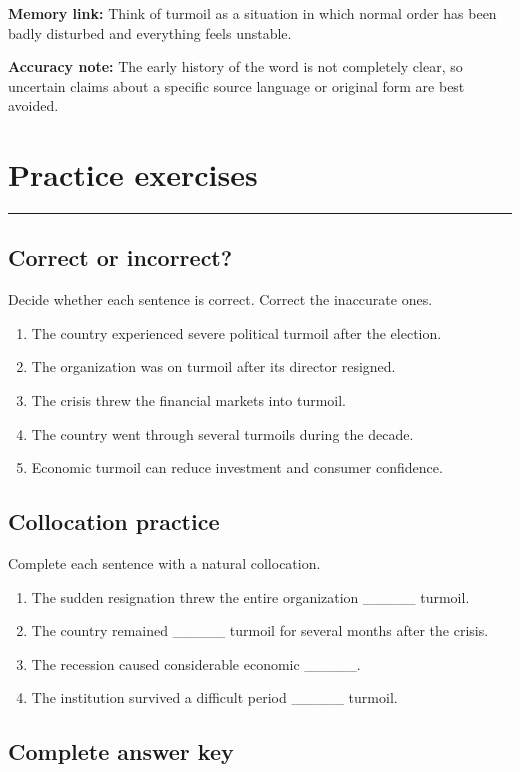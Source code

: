 \documentclass[11pt]{article}
\newcommand{\sectionrule}{\par\vspace{-0.5em}\noindent\textcolor{Accent}{\rule{\linewidth}{0.6pt}}\par}
\begin{document}
\textbf{Memory link:} Think of turmoil as a situation in which normal order has been badly disturbed and everything feels unstable.

\textbf{Accuracy note:} The early history of the word is not completely clear, so uncertain claims about a specific source language or original form are best avoided.

\section{Practice exercises}
\sectionrule
\subsection{Correct or incorrect?}
Decide whether each sentence is correct. Correct the inaccurate ones.

\begin{enumerate}
  \item The country experienced severe political turmoil after the election.
  \item The organization was on turmoil after its director resigned.
  \item The crisis threw the financial markets into turmoil.
  \item The country went through several turmoils during the decade.
  \item Economic turmoil can reduce investment and consumer confidence.
\end{enumerate}

\subsection{Collocation practice}
Complete each sentence with a natural collocation.

\begin{enumerate}
  \item The sudden resignation threw the entire organization \_\_\_\_\_ turmoil.
  \item The country remained \_\_\_\_\_ turmoil for several months after the crisis.
  \item The recession caused considerable economic \_\_\_\_\_.
  \item The institution survived a difficult period \_\_\_\_\_ turmoil.
\end{enumerate}

\subsection{Complete answer key}
\end{document}
